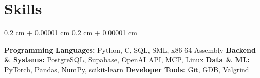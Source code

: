 \documentclass[10pt, letterpaper]{article}
\newenvironment{highlights}{
    \begin{itemize}[
        topsep=0.10 cm,
        parsep=0.10 cm,
        partopsep=0pt,
        itemsep=0pt,
        leftmargin=0.4 cm + 10pt
    ]
}{
    \end{itemize}
} %
\newenvironment{onecolentry}{
    \begin{adjustwidth}{
        0.2 cm + 0.00001 cm
    }{
        0.2 cm + 0.00001 cm
    }
}{
    \end{adjustwidth}
} %
\begin{document}
    \section{Skills}
        \begin{onecolentry}
            \textbf{Programming Languages:} Python, C, SQL, SML, x86-64 Assembly \newline
            \textbf{Backend \& Systems:} PostgreSQL, Supabase, OpenAI API, MCP, Linux \newline
            \textbf{Data \& ML:} PyTorch, Pandas, NumPy, scikit-learn \newline
            \textbf{Developer Tools:} Git, GDB, Valgrind
        \end{onecolentry}
    \vspace{0.20 cm}

    

    
\end{document}
